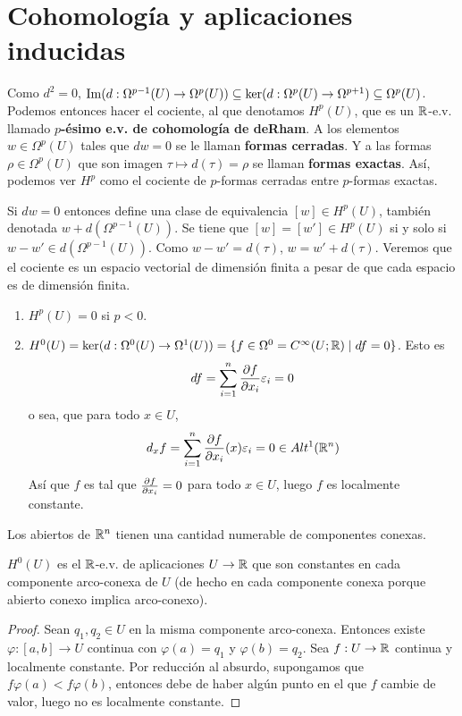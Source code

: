 \documentclass[CV.tex]{subfiles}
\begin{document}
\section{Cohomología y aplicaciones inducidas}


Como $d^2=0$, $\operatorname{Im}(d:\Omega^{p-1}(U)\to\Omega^p(U))\subseteq\ker(d:\Omega^p(U)\to\Omega^{p+1})\subseteq\Omega^p(U)$. Podemos entonces hacer el cociente, al que denotamos $H^p(U)$, que es un $\mathbb{R}$-e.v. llamado \textbf{$p$-ésimo e.v. de cohomología de deRham}. A los elementos $w\in\Omega^p(U)$ tales que $dw=0$ se le llaman \textbf{formas cerradas}. Y a las formas $\rho\in\Omega^p(U)$ que son imagen $\tau\mapsto d(\tau)=\rho$ se llaman \textbf{formas exactas}. Así, podemos ver $H^p$ como el cociente de $p$-formas cerradas entre $p$-formas exactas. 

Si $dw=0$ entonces define una clase de equivalencia $[w]\in H^p(U)$, también denotada $w+d(\Omega^{p-1}(U))$. Se tiene que $[w]=[w']\in H^p(U)$ si y solo si $w-w'\in d(\Omega^{p-1}(U))$. Como $w-w'=d(\tau)$, $w=w'+d(\tau)$. Veremos que el cociente es un espacio vectorial de dimensión finita a pesar de que cada espacio es de dimensión finita. 

\begin{ej}
\begin{enumerate}
\item $H^p(U)=0$ si $p<0$.
\item $H^0(U)=\ker(d:\Omega^0(U)\to\Omega^1(U))=\{f\in\Omega^0=C^{\infty}(U;\mathbb{R})\mid df=0\}$. Esto es
\[
df=\sum_{i=1}^n\frac{\partial f}{\partial x_i}\varepsilon_i=0
\]
o sea, que para todo $x\in U$,
\[
d_xf=\sum_{i=1}^n\frac{\partial f}{\partial x_i}(x)\varepsilon_i=0\in Alt^1(\mathbb{R}^n)
\]
Así que $f$ es tal que $\frac{\partial f}{\partial x_i}=0$ para todo $x\in U$, luego $f$ es localmente constante.
\end{enumerate}
\end{ej}

\begin{nota}
Los abiertos de $\mathbb{R}^n$ tienen una cantidad numerable de componentes conexas. 
\end{nota}


\begin{lemma}
$H^0(U)$ es el $\mathbb{R}$-e.v. de aplicaciones $U\to\mathbb{R}$ que son constantes en cada componente arco-conexa de $U$ (de hecho en cada componente conexa porque abierto conexo implica arco-conexo). 
\end{lemma}
\begin{proof}
Sean $q_1,q_2\in U$ en la misma componente arco-conexa. Entonces existe $\varphi:[a,b]\to U$ continua con $\varphi(a)=q_1$ y $\varphi(b)=q_2$. Sea $f:U\to \mathbb{R}$ continua y localmente constante. Por reducción al absurdo, supongamos que $f\varphi(a)<f\varphi(b)$, entonces debe de haber algún punto en el que $f$ cambie de valor, luego no es localmente constante.
\end{proof}
\end{document}
